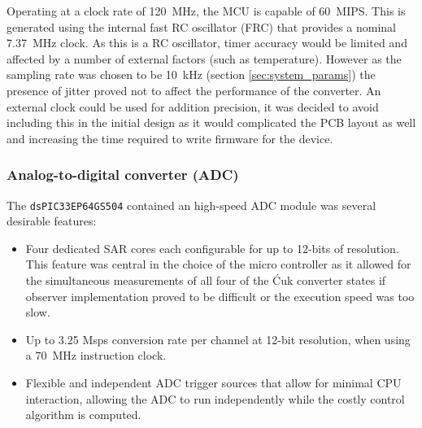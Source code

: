 Operating at a clock rate of \SI{120}{MHz}, the MCU is capable of \SI{60}{MIPS}. This is generated using the internal fast RC oscillator (FRC) that provides a nominal \SI{7.37}{MHz} clock. As this is a RC oscillator, timer accuracy would be limited and affected by a number of external factors (such as temperature). However as the sampling rate was chosen to be \SI{10}{kHz} (section \ref{sec:system_params}) the presence of jitter proved not to affect the performance of the converter. An external clock could be used for addition precision, it was decided to avoid including this in the initial design as it would complicated the PCB layout as well and increasing the time required to write firmware for the device.
\subsubsection{Analog-to-digital converter (ADC)}
The \texttt{dsPIC33EP64GS504} contained an high-speed ADC module was several desirable features:
\begin{itemize}
    \item Four dedicated SAR cores each configurable for up to 12-bits of resolution. This feature was central in the choice of the micro controller as it allowed for the simultaneous measurements of all four of the \'Cuk converter states if observer implementation proved to be difficult or the execution speed was too slow.
    \item Up to 3.25 Msps conversion rate per channel at 12-bit resolution, when using a \SI{70}{MHz} instruction clock.
    \item Flexible and independent ADC trigger sources that allow for minimal CPU interaction, allowing the ADC to run independently while the costly control algorithm is computed.
\end{itemize}

